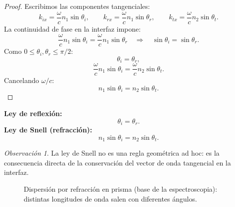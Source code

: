 \documentclass[12pt, a4paper]{article}
\theoremstyle{plain}
\theoremstyle{definition}
\theoremstyle{remark}
\newtheorem*{observacion}{Observación}
\begin{document}
\begin{proof}
Escribimos las componentes tangenciales:
\[
  k_{ix} = \frac{\omega}{c}n_1 \sin\theta_i,
  \qquad
  k_{rx} = \frac{\omega}{c}n_1 \sin\theta_r,
  \qquad
  k_{tx} = \frac{\omega}{c}n_2 \sin\theta_t.
\]
La continuidad de fase en la interfaz impone:
\[
  \frac{\omega}{c}n_1\sin\theta_i = \frac{\omega}{c}n_1\sin\theta_r
  \quad\Rightarrow\quad
  \sin\theta_i=\sin\theta_r.
\]
Como $0\le\theta_i,\theta_r\le\pi/2$:
\[
  \theta_i = \theta_r,
\]
\[
  \frac{\omega}{c}n_1\sin\theta_i = \frac{\omega}{c}n_2\sin\theta_t.
\]
Cancelando $\omega/c$:
\[
  n_1\sin\theta_i=n_2\sin\theta_t.
\]
\end{proof}

\begin{mdframed}[style=resultado]
\textbf{Ley de reflexión:}
\begin{equation}
  \theta_i = \theta_r.
  \label{eq:ley_reflexion}
\end{equation}
\textbf{Ley de Snell (refracción):}
\begin{equation}
  n_1 \sin\theta_i = n_2 \sin\theta_t.
  \label{eq:snell}
\end{equation}
\end{mdframed}

\begin{observacion}
La ley de Snell no es una regla geométrica ad hoc: es la consecuencia directa
de la conservación del vector de onda tangencial en la interfaz.
\end{observacion}

\begin{figure}[H]
  \centering
  \caption{Dispersión por refracción en prisma (base de la espectroscopia):
           distintas longitudes de onda salen con diferentes ángulos.}
  \label{fig:prisma_dispersion}
\end{figure}
\end{document}
